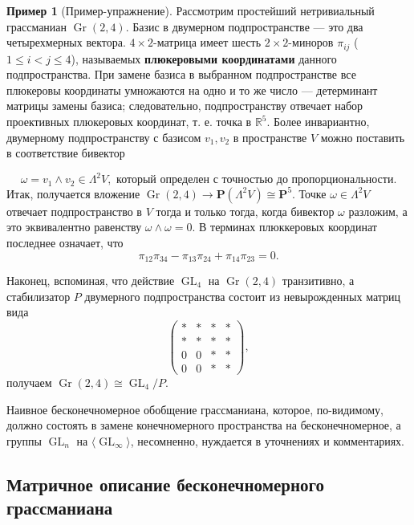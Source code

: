 \documentclass{article}
\theoremstyle{definition}
\theoremstyle{definition} %
\theoremstyle{remark}     %
\theoremstyle{definition}
\theoremstyle{definition}
\theoremstyle{definition}
\theoremstyle{definition}
\theoremstyle{definition}
\theoremstyle{definition}
\newtheorem*{example}{Пример}
\theoremstyle{definition}
\theoremstyle{definition}
\begin{document}
\begin{example}[Пример-упражнение]
  Рассмотрим простейший нетривиальный грассманиан $\operatorname{Gr}(2, 4)$. Базис в двумерном подпространстве — это два четырехмерных вектора. $4 \times 2$-матрица имеет шесть $2 \times 2$-миноров $\pi_{ij}$ ($1 \leq i < j \leq 4$), называемых \textbf{плюкеровыми координатами} данного подпространства. При замене базиса в выбранном подпространстве все плюкеровы координаты умножаются на одно и то же число — детерминант матрицы замены базиса; следовательно, подпространству отвечает набор проективных плюкеровых координат, т. е. точка в $\mathbb{R}^5$. Более инвариантно, двумерному подпространству с базисом $v_1, v_2$ в пространстве $V$ можно поставить в соответствие бивектор
\end{example}

\[
\omega = v_1 \land v_2 \in \Lambda^2 V, \text{ который определен с точностью до пропорциональности.}
\]
Итак, получается вложение \(\operatorname{Gr}(2, 4) \to \mathbf{P}(\Lambda^2 V) \cong \mathbf{P}^5\). Точке \(\omega \in \Lambda^2 V\) отвечает подпространство в \(V\) тогда и только тогда, когда бивектор \(\omega\) разложим, а это эквивалентно равенству \(\omega \land \omega = 0\). В терминах плюккеровых координат последнее означает, что
\[
\pi_{12} \pi_{34} - \pi_{13} \pi_{24} + \pi_{14} \pi_{23} = 0.
\]

Наконец, вспоминая, что действие \(\operatorname{GL}_4\) на \(\operatorname{Gr}(2, 4)\) транзитивно, а стабилизатор \(P\) двумерного подпространства состоит из невырожденных матриц вида
\[
\begin{pmatrix}
* & * & * & * \\
* & * & * & * \\
0 & 0 & * & * \\
0 & 0 & * & *
\end{pmatrix},
\]
получаем \(\operatorname{Gr}(2, 4) \cong \operatorname{GL}_4 / P\).

Наивное бесконечномерное обобщение грассманиана, которое, по-видимому, должно состоять в замене конечномерного пространства на бесконечномерное, а группы \(\operatorname{GL}_n\) на \(\langle \operatorname{GL}_\infty \rangle\), несомненно, нуждается в уточнениях и комментариях.



\subsection{Матричное описание бесконечномерного грассманиана}
\end{document}
